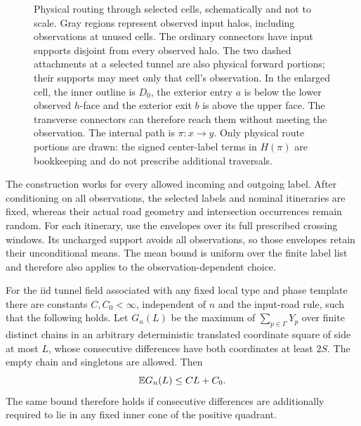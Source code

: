 \begin{figure}[t]
\caption{Physical routing through selected cells, schematically and not to
scale. Gray regions represent observed input halos, including observations
at unused cells. The ordinary connectors have input supports disjoint from
every observed halo. The two dashed attachments at a selected tunnel are
also physical forward portions; their supports may meet only that cell's
observation. In the enlarged cell, the inner outline is $D_0$, the exterior
entry $a$ is below the lower
observed $h$-face and the exterior exit $b$ is above the upper face. The
transverse connectors can therefore reach them without meeting the
observation. The internal path is $\pi:x\to y$. Only physical route portions
are drawn: the signed center-label terms in $H(\pi)$ are bookkeeping and do
not prescribe additional traversals.}
\label{fig:observed-halos-corridors}
\end{figure}

The construction works for every allowed incoming and outgoing label.
After conditioning on all observations, the selected labels and nominal
itineraries are fixed, whereas their actual road geometry and
intersection occurrences remain random.  For each itinerary, use the
envelopes over its full prescribed crossing windows.  Its uncharged
support avoids all observations, so those envelopes retain their
unconditional means.  The mean bound is uniform over the finite label
list and therefore also applies to the observation-dependent choice.

\begin{proposition}
\label{access:collection}
For the iid tunnel field associated with any fixed local type and phase
template there are constants $C,C_0<\infty$, independent of $n$ and the
input-road rule, such that the following holds.  Let $G_n(L)$ be the
maximum of $\sum_{p\in\Gamma}Y_p$ over finite distinct chains in an
arbitrary deterministic translated coordinate square of side at most
$L$, whose consecutive differences have both coordinates at least $2S$.
The empty chain and singletons are allowed.  Then
\begin{equation}\label{access:finite-volume}
                       \mathbb E G_n(L)\le CL+C_0.
\end{equation}
The same bound therefore holds if consecutive differences are additionally
required to lie in any fixed inner cone of the positive quadrant.
\end{proposition}

